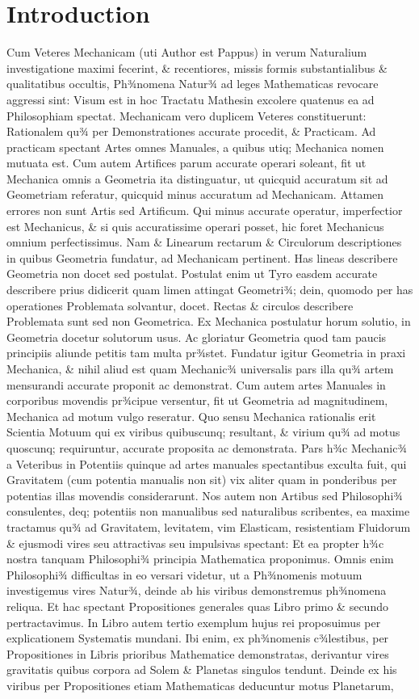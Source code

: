 \chapter{Introduction}

Cum Veteres Mechanicam (uti Author est Pappus) in verum Naturalium investigatione maximi fecerint, \& recentiores, missis formis substantialibus \& qualitatibus occultis, Ph¾nomena Natur¾ ad leges Mathematicas revocare aggressi sint: Visum est in hoc Tractatu Mathesin excolere quatenus ea ad Philosophiam spectat. Mechanicam vero duplicem Veteres constituerunt: Rationalem qu¾ per Demonstrationes accurate procedit, \& Practicam. Ad practicam spectant Artes omnes Manuales, a quibus utiq; Mechanica nomen mutuata est. Cum autem Artifices parum accurate operari soleant, fit ut Mechanica omnis a Geometria ita distinguatur, ut quicquid accuratum sit ad Geometriam referatur, quicquid minus accuratum ad Mechanicam. Attamen errores non sunt Artis sed Artificum. Qui minus accurate operatur, imperfectior est Mechanicus, \& si quis accuratissime operari posset, hic foret Mechanicus omnium perfectissimus. Nam \& Linearum rectarum \& Circulorum descriptiones in quibus Geometria fundatur, ad Mechanicam pertinent. Has lineas describere Geometria non docet sed postulat. Postulat enim ut Tyro easdem accurate describere prius didicerit quam limen attingat Geometri¾; dein, quomodo per has operationes Problemata solvantur, docet. Rectas \& circulos describere Problemata sunt sed non Geometrica. Ex Mechanica postulatur horum solutio, in Geometria docetur solutorum usus. Ac gloriatur Geometria quod tam paucis principiis aliunde petitis tam multa pr¾stet. Fundatur igitur Geometria in praxi Mechanica, \& nihil aliud est quam Mechanic¾ universalis pars illa qu¾ artem mensurandi accurate proponit ac demonstrat. Cum autem artes Manuales in corporibus movendis pr¾cipue versentur, fit ut Geometria ad magnitudinem, Mechanica ad motum vulgo reseratur. Quo sensu Mechanica rationalis erit Scientia Motuum qui ex viribus quibuscunq; resultant, \& virium qu¾ ad motus quoscunq; requiruntur, accurate proposita ac demonstrata. Pars h¾c Mechanic¾ a Veteribus in Potentiis quinque ad artes manuales spectantibus exculta fuit, qui Gravitatem (cum potentia manualis non sit) vix aliter quam in ponderibus per potentias illas movendis considerarunt. Nos autem non Artibus sed Philosophi¾ consulentes, deq; potentiis non manualibus sed naturalibus scribentes, ea maxime tractamus qu¾ ad Gravitatem, levitatem, vim Elasticam, resistentiam Fluidorum \& ejusmodi vires seu attractivas seu impulsivas spectant: Et ea propter h¾c nostra tanquam Philosophi¾ principia Mathematica proponimus. Omnis enim Philosophi¾ difficultas in eo versari videtur, ut a Ph¾nomenis motuum investigemus vires Natur¾, deinde ab his viribus demonstremus ph¾nomena reliqua. Et hac spectant Propositiones generales quas Libro primo \& secundo pertractavimus. In Libro autem tertio exemplum hujus rei proposuimus per explicationem Systematis mundani. Ibi enim, ex ph¾nomenis c¾lestibus, per Propositiones in Libris prioribus Mathematice demonstratas, derivantur vires gravitatis quibus corpora ad Solem \& Planetas singulos tendunt. Deinde ex his viribus per Propositiones etiam Mathematicas deducuntur motus Planetarum, 